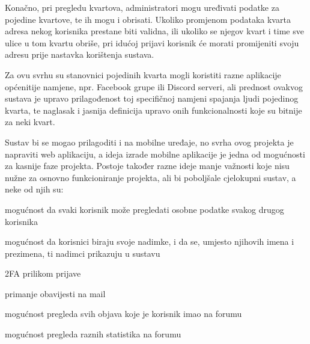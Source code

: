	Konačno, pri pregledu kvartova, administratori mogu uređivati podatke za pojedine kvartove, te ih mogu i obrisati. Ukoliko promjenom podataka kvarta adresa nekog korisnika prestane biti validna, ili ukoliko se njegov kvart i time sve ulice u tom kvartu obriše, pri idućoj prijavi korisnik će morati promijeniti svoju adresu prije nastavka korištenja sustava.
	
	Za ovu svrhu su stanovnici pojedinih kvarta mogli koristiti razne aplikacije općenitije namjene, npr. Facebook grupe ili Discord serveri, ali prednost ovakvog sustava je upravo prilagođenost toj specifičnoj namjeni spajanja ljudi pojedinog kvarta, te naglasak i jasnija definicija upravo onih funkcionalnosti koje su bitnije za neki kvart.
	
	Sustav bi se mogao prilagoditi i na mobilne uređaje, no svrha ovog projekta je napraviti web aplikaciju, a ideja izrade mobilne aplikacije je jedna od mogućnosti za kasnije faze projekta. Postoje također razne ideje manje važnosti koje nisu nužne za osnovno funkcioniranje projekta, ali bi poboljšale cjelokupni sustav, a neke od njih su:
	
	\begin{packed_item}
		\item 	mogućnost da svaki korisnik može pregledati osobne podatke svakog drugog korisnika
		\item	mogućnost da korisnici biraju svoje nadimke, i da se, umjesto njihovih imena i prezimena, ti nadimci prikazuju u sustavu
		\item 	2FA prilikom prijave
		\item 	primanje obavijesti na mail
		\item 	mogućnost pregleda svih objava koje je korisnik imao na forumu
		\item	mogućnost pregleda raznih statistika na forumu
		
	\end{packed_item}